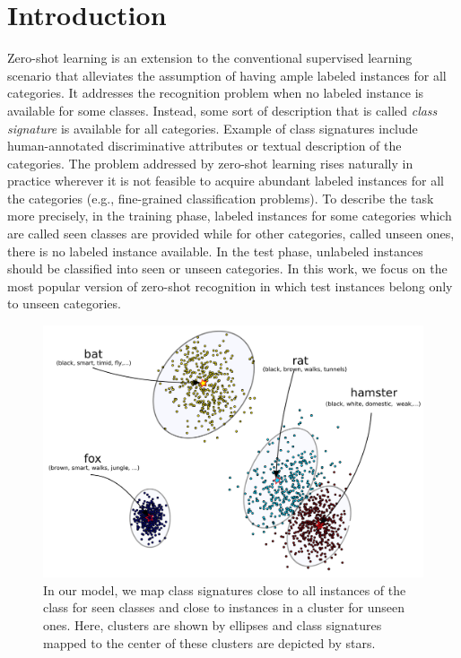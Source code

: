 \documentclass[10pt,twocolumn,letterpaper]{article}
\begin{document}
\section{Introduction}
Zero-shot learning \cite{bengio08,hinton09,lampert09,farhadi09} is an extension to the conventional supervised learning scenario
that alleviates the assumption of having ample labeled instances for all categories. It addresses the
recognition problem when no labeled instance is available for some classes.
Instead, some sort of description that is called \textit{class signature} is available for all categories.
Example of class signatures include human-annotated discriminative attributes or textual description of the categories.
The problem addressed by zero-shot learning rises naturally in practice wherever it is not feasible to acquire abundant labeled instances for
 all the categories (e.g., fine-grained classification problems).
To describe the task more precisely, in the training phase, labeled instances for some categories which are called seen classes are provided
while for other categories, called unseen ones, there is no labeled instance available.
In the test phase, unlabeled instances should be classified into seen or unseen categories.
 In this work, we focus on the most popular version of zero-shot recognition in which test instances belong only to unseen categories.
 \begin{figure}[!t]
 \begin{center}
 \includegraphics[width=0.98\columnwidth]{overview.pdf}
 \caption{In our model, we map class signatures close to all instances of the class for seen classes and close to instances in a cluster for unseen ones.
Here, clusters are shown by ellipses and class signatures mapped to the center of these clusters are depicted by stars.}
 \label{fig:overview}
 \end{center}
 \end{figure}
\end{document}
